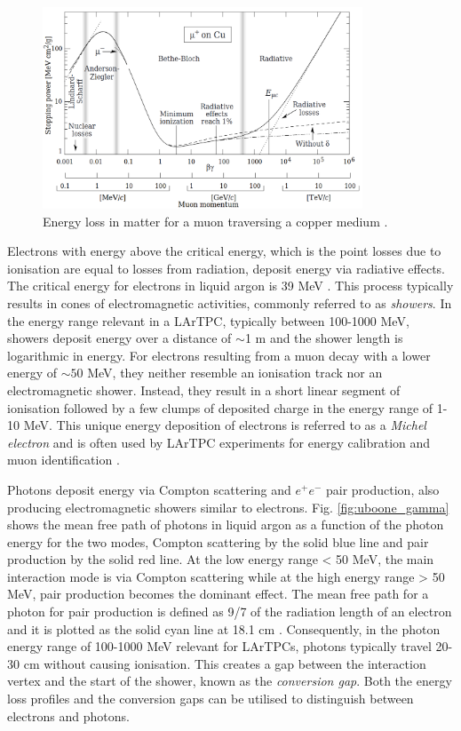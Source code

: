 \begin{figure}[ht!] 
\centering    
\includegraphics[width=0.85\textwidth]{BetheBloch}
\caption[Muon Energy Loss in a Copper Medium]{
Energy loss in matter for a muon traversing a copper medium \cite{Passage}.
}
\label{fig:BetheBloch}
\end{figure}

Electrons with energy above the critical energy, which is the point losses due to ionisation are equal to losses from radiation, deposit energy via radiative effects.
The critical energy for electrons in liquid argon is 39 MeV \cite{uboone_gamma}.
This process typically results in cones of electromagnetic activities, commonly referred to as \textit{showers}.
In the energy range relevant in a LArTPC, typically between 100-1000 MeV, showers deposit energy over a distance of $\sim$1 m and the shower length is logarithmic in energy.
For electrons resulting from a muon decay with a lower energy of $\sim50$ MeV, they neither resemble an ionisation track nor an electromagnetic shower.
Instead, they result in a short linear segment of ionisation followed by a few clumps of deposited charge in the energy range of 1-10 MeV.
This unique energy deposition of electrons is referred to as a \textit{Michel electron} and is often used by LArTPC experiments for energy calibration and muon identification \cite{uboone_michel}.

Photons deposit energy via Compton scattering and $e^+e^-$ pair production, also producing electromagnetic showers similar to electrons.
Fig. \ref{fig:uboone_gamma} shows the mean free path of photons in liquid argon as a function of the photon energy for the two modes, Compton scattering by the solid blue line and pair production by the solid red line.
At the low energy range < 50 MeV, the main interaction mode is via Compton scattering while at the high energy range > 50 MeV, pair production becomes the dominant effect.
The mean free path for a photon for pair production is defined as 9/7 of the radiation length of an electron and it is plotted as the solid cyan line at 18.1 cm \cite{Passage}.
Consequently, in the photon energy range of 100-1000 MeV relevant for LArTPCs, photons typically travel 20-30 cm without causing ionisation.
This creates a gap between the interaction vertex and the start of the shower, known as the \textit{conversion gap}.
Both the energy loss profiles and the conversion gaps can be utilised to distinguish between electrons and photons. 

